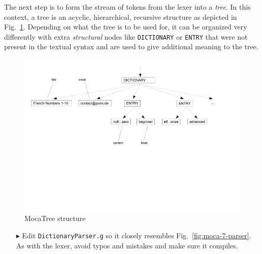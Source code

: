 The next step is to form the stream of tokens from the lexer into a \emph{tree}.
In this context, a tree is an acyclic, hierarchical, recursive structure as depicted in Fig.~\ref{fig:moca-5-Tree}.
Depending on what the tree is to be used for, it can be organized very differently with extra \emph{structural} nodes like \texttt{DICTIONARY} or \texttt{ENTRY} that were not present in the textual syntax and are used to give additional meaning to the tree. 

\begin{figure}[htp]
\begin{center}
 \includegraphics[width=\textwidth]{pics/moca/2TextToMocaTree/5-tree}
  \caption{MocaTree structure}
  \label{fig:moca-5-Tree}
\end{center}
\end{figure}

\begin{enumerate}
\item[$\blacktriangleright$] Edit \texttt{DictionaryParser.g} so it closely resembles Fig.~\ref{fig:moca-7-parser}.
As with the lexer, avoid typos and mistakes and make sure it compiles.
\end{enumerate}

